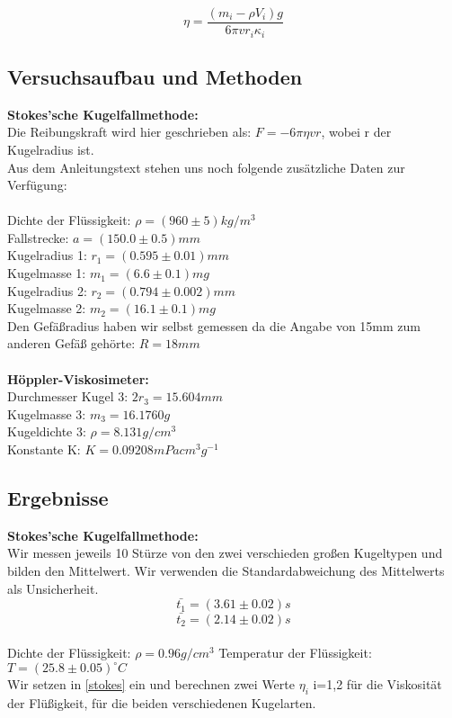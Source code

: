\documentclass{article}
\begin{document}
\begin{equation}
\eta=\frac{(m_i-\rho V_i)g}{6\pi v r_i \kappa_i}
\end{equation}
\subsection{Versuchsaufbau und Methoden}

\textbf{Stokes'sche Kugelfallmethode:}\\
Die Reibungskraft wird hier geschrieben als:
$F = -6 \pi \eta v r$, wobei r der Kugelradius ist. \\
Aus dem Anleitungstext stehen uns noch folgende zusätzliche Daten zur Verfügung:\\
\\
Dichte der Flüssigkeit: $\rho=(960 \pm 5) kg/m^3$\\
Fallstrecke: $a=(150.0 \pm 0.5)mm$\\
Kugelradius 1: $r_1=(0.595 \pm 0.01)mm$\\
Kugelmasse 1: $m_1=(6.6 \pm 0.1)mg$\\
Kugelradius 2: $r_2=(0.794 \pm 0.002)mm$\\
Kugelmasse 2: $m_2=(16.1 \pm 0.1)mg$\\
Den Gefäßradius haben wir selbst gemessen da die Angabe von 15mm zum anderen Gefäß gehörte: $R=18mm$\\ 
\\
\textbf{Höppler-Viskosimeter:}\\
Durchmesser Kugel 3: $2r_3=15.604mm$\\
Kugelmasse 3: $m_3=16.1760g$\\
Kugeldichte 3: $\rho=8.131 g/cm^3$\\
Konstante K: $K=0.09208mPa cm^3 g^{-1}$\\

\subsection{Ergebnisse}
\textbf{Stokes'sche Kugelfallmethode:}\\
Wir messen jeweils 10 Stürze von den zwei verschieden großen Kugeltypen und bilden den Mittelwert. Wir verwenden die Standardabweichung des Mittelwerts als Unsicherheit.
$$\bar{t_1}=(3.61\pm0.02)s$$
$$\bar{t_2}=(2.14\pm0.02)s$$
\\
Dichte der Flüssigkeit: $\rho=0.96 g/cm^3$
Temperatur der Flüssigkeit: $T=(25.8 \pm 0.05)^\circ C$
\\
Wir setzen in \ref{stokes} ein und berechnen zwei Werte $\eta_i$ i=1,2 für die Viskosität der Flüßigkeit, für die beiden verschiedenen Kugelarten. \\
\end{document}

